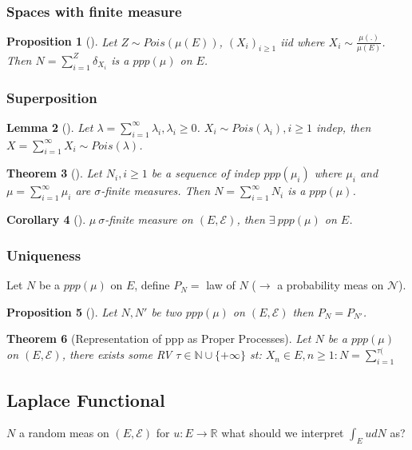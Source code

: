 \documentclass[12pt]{book}
\newtheorem{theorem}{Theorem}[section]
\newtheorem{prop}[theorem]{Proposition}
\newtheorem{cor}[theorem]{Corollary}
\newtheorem{lemma}[theorem]{Lemma}
\theoremstyle{definition}
\theoremstyle{remark}
\begin{document}
\subsubsection{Spaces with finite measure}
\begin{prop}[]
	Let $Z \sim Pois(\mu(E))$, $(X_i)_{i\geq 1}$ iid where $X_i \sim \frac{\mu(.)}{\mu(E)}$. Then $N= \sum_{i=1}^{Z} \delta_{X_i} $ is a $ppp(\mu)$ on $E$.
\end{prop}

\subsubsection{Superposition}
\begin{lemma}[]
	Let $\lambda = \sum_{i=1}^{\infty} \lambda_i, \lambda_i\geq 0$. $X_i \sim Pois(\lambda_i), i \geq 1$ indep, then $X = \sum_{i=1}^{\infty} X_i \sim Pois(\lambda)$.
\end{lemma}

\begin{theorem}[]
	Let $N_i, i\geq 1$ be a sequence of indep $ppp(\mu_i)$ where $\mu_i$ and $\mu = \sum_{i=1}^{\infty} \mu_i$ are $\sigma$-finite measures. Then $N= \sum_{i=1}^{\infty} N_i$ is a $ppp(\mu )$.
\end{theorem}

\begin{cor}[]
	$\mu \ \sigma$-finite measure on $(E, \mathcal{E})$, then $\exists\ ppp(\mu)$ on $E$.
\end{cor}

\subsubsection{Uniqueness}
Let $N$ be a $ppp(\mu )$ on $E$, define $P_N = $ law of $N$ ($\rightarrow$ a probability meas on $ \mathcal{N}$).

\begin{prop}[]
	Let $N, N'$ be two $ppp(\mu )$ on $(E, \mathcal{E})$ then $P_N = P_{N'}$.
\end{prop}

\begin{theorem}[Representation of ppp as Proper Processes]
	Let $N$ be a $ppp(\mu )$ on $(E, \mathcal{E})$, there exists some RV $\tau \in \mathbb{N} \cup \{+\infty \}$ st: $X_n \in E, n\geq 1: N = \sum_{i=1}^{\tau(} $
\end{theorem}

\subsection{Laplace Functional}
$N$ a random meas on $(E, \mathcal{E})$ for $u:E \to \mathbb{R}$ what should we interpret $\int_E u dN$ as?
\end{document}
